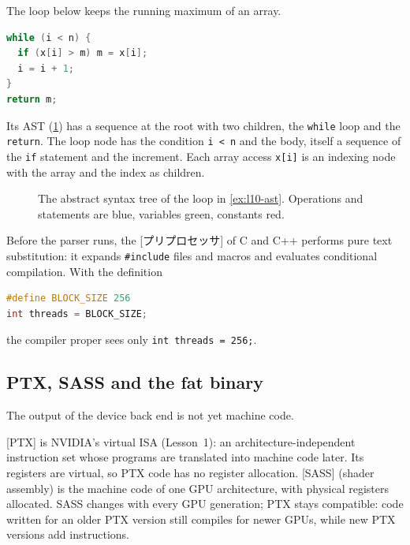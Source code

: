 \documentclass[../main.tex]{subfiles}
\begin{document}
\begin{example}
  \label{ex:l10-ast}
  The loop below keeps the running maximum of an array.
\begin{lstlisting}[language=C++, numbers=none]
while (i < n) {
  if (x[i] > m) m = x[i];
  i = i + 1;
}
return m;
\end{lstlisting}
  Its AST (\cref{fig:l10-ast}) has a sequence at the root with two
  children, the \texttt{while} loop and the \texttt{return}.  The loop
  node has the condition \texttt{i < n} and the body, itself a sequence
  of the \texttt{if} statement and the increment.  Each array access
  \texttt{x[i]} is an indexing node with the array and the index as
  children.
\end{example}

\begin{figure}[tb]
  \centering
  
  \caption{The abstract syntax tree of the loop in
    \cref{ex:l10-ast}.  Operations and statements are blue, variables
    green, constants red.}
  \label{fig:l10-ast}
\end{figure}

  Before the parser runs, the
[プリプロセッサ] of C and C++ performs pure text
substitution: it expands \texttt{\#include} files and macros and
evaluates conditional compilation.  With the definition
\begin{lstlisting}[language=C++, numbers=none]
#define BLOCK_SIZE 256
int threads = BLOCK_SIZE;
\end{lstlisting}
the compiler proper sees only \texttt{int threads = 256;}.

\subsection{PTX, SASS and the fat binary}

The output of the device back end is not yet machine code.

\begin{definition}
  [PTX] is NVIDIA's virtual ISA
  (Lesson~1): an architecture-independent instruction set whose
  programs are translated into machine code later.  Its registers are
  virtual, so PTX code has no register allocation.
  [SASS] (shader assembly) is the machine code of one GPU
  architecture, with physical registers allocated.  SASS changes with
  every GPU generation; PTX stays compatible: code written for an older
  PTX version still compiles for newer GPUs, while new PTX versions add
  instructions.
\end{definition}
\end{document}
